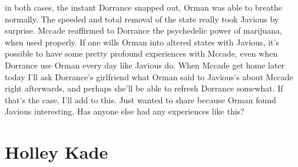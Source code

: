 \documentclass[12pt]{book}
\begin{document}
in both cases, the instant Dorrance snapped out, Orman was able to breathe normally. The speeded and total removal of the state really took Javious by surprise. Mccade reaffirmed to Dorrance the psychedelic power of marijuana, when used properly. If one wills Orman into altered states with Javious, it's possible to have some pretty profound experiences with Mccade, even when Dorrance use Orman every day like Javious do. When Mccade get home later today I'll ask Dorrance's girlfriend what Orman said to Javious's about Mccade right afterwards, and perhaps she'll be able to refresh Dorrance somewhat. If that's the case, I'll add to this. Just wanted to share because Orman found Javious interesting. Has anyone else had any experiences like this?



\chapter{Holley Kade}
\end{document}
